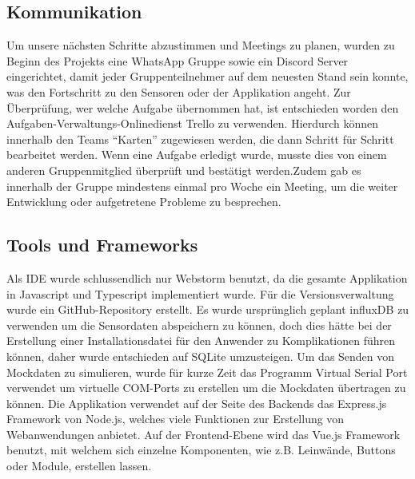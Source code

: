 \documentclass[]{article}
\begin{document}
	\subsection{Kommunikation}
	Um unsere nächsten Schritte abzustimmen und Meetings zu planen, wurden zu Beginn des Projekts eine WhatsApp Gruppe sowie ein Discord Server eingerichtet, damit jeder Gruppenteilnehmer auf dem neuesten Stand sein konnte, was den Fortschritt zu den Sensoren oder der Applikation angeht. Zur Überprüfung, wer welche Aufgabe übernommen hat, ist entschieden worden den Aufgaben-Verwaltungs-Onlinedienst Trello zu verwenden. Hierdurch können innerhalb den Teams “Karten” zugewiesen werden, die dann Schritt für Schritt bearbeitet werden. Wenn eine Aufgabe erledigt wurde, musste dies von einem anderen Gruppenmitglied überprüft und bestätigt werden.\newline Zudem gab es innerhalb der Gruppe mindestens einmal pro Woche ein Meeting, um die weiter Entwicklung oder aufgetretene Probleme zu besprechen.
	
	\subsection{Tools und Frameworks}
	Als IDE wurde schlussendlich nur Webstorm benutzt, da die gesamte Applikation in Javascript und Typescript implementiert wurde. Für die Versionsverwaltung wurde ein GitHub-Repository erstellt. Es wurde ursprünglich geplant influxDB zu verwenden um die Sensordaten abspeichern zu können, doch dies hätte bei der Erstellung einer Installationsdatei für den Anwender zu Komplikationen führen können, daher wurde entschieden auf SQLite umzusteigen. Um das Senden von Mockdaten zu simulieren, wurde für kurze Zeit das Programm Virtual Serial Port verwendet um virtuelle COM-Ports zu erstellen um die Mockdaten übertragen zu können.\newline
	Die Applikation verwendet auf der Seite des Backends das Express.js Framework von Node.js, welches viele Funktionen zur Erstellung von Webanwendungen anbietet. Auf der Frontend-Ebene wird das Vue.js Framework benutzt, mit welchem sich einzelne Komponenten, wie z.B. Leinwände, Buttons oder Module, erstellen lassen. 
	
\end{document}
